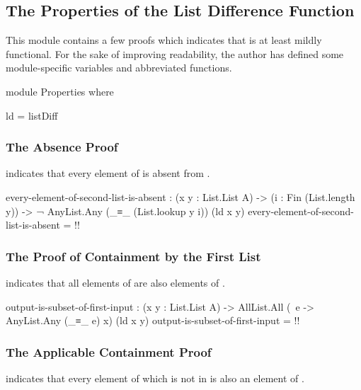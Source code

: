 \documentclass{report}
\begin{document}
\subsection{The Properties of the List Difference Function}
This module contains a few proofs which indicates that  is at least mildly functional.  For the sake of improving readability, the author has defined some module-specific variables and abbreviated functions.

\begin{code}
  module Properties where

    ld = listDiff
\end{code}

\subsubsection{The Absence Proof}
   indicates that every element of  is absent from   .

\begin{code}
    every-element-of-second-list-is-absent :
      (x y : List.List A) ->
      (i : Fin (List.length y)) ->
      ¬ AnyList.Any (_≡_ (List.lookup y i)) (ld x y)
    every-element-of-second-list-is-absent = {!!}
\end{code}

\subsubsection{The Proof of Containment by the First List}
   indicates that all elements of    are also elements of .

\begin{code}
    output-is-subset-of-first-input :
      (x y : List.List A) ->
      AllList.All (\ e -> AnyList.Any (_≡_ e) x) (ld x y)
    output-is-subset-of-first-input = {!!}
\end{code}

\subsubsection{The Applicable Containment Proof}
 indicates that every element of  which is not in  is also an element of   .
\end{document}
